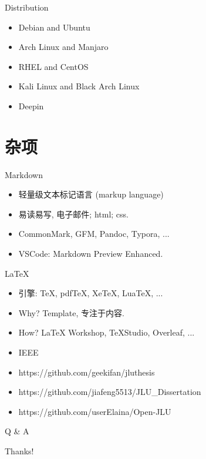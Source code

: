 \documentclass{beamer}
\begin{document}
\begin{frame}{Distribution}
    \begin{itemize}
        \item Debian and Ubuntu
        \item Arch Linux and Manjaro
        \item RHEL and CentOS
        \item Kali Linux and Black Arch Linux
        \item Deepin
    \end{itemize}
\end{frame}




\section{杂项}

\begin{frame}{Markdown}
    \begin{itemize}
        \item 轻量级文本标记语言 (markup language)
        \item 易读易写, 电子邮件; html; css.
        \item CommonMark, GFM, Pandoc, Typora, ...
        \item VSCode: Markdown Preview Enhanced.
    \end{itemize}
\end{frame}

\begin{frame}{LaTeX}
    \begin{itemize}
        \item 引擎: TeX, pdfTeX, XeTeX, LuaTeX, ...
        \item Why? Template, 专注于内容.
        \item How? LaTeX Workshop, TeXStudio, Overleaf, ...
        \item IEEE
        \item https://github.com/geekifan/jluthesis
        \item https://github.com/jiafeng5513/JLU\_Dissertation
        \item https://github.com/userElaina/Open-JLU
    \end{itemize}
\end{frame}

\begin{frame}{Q \& A}
    \begin{center}
        {\Huge\calligra Thanks!}
    \end{center}
\end{frame}
\end{document}

